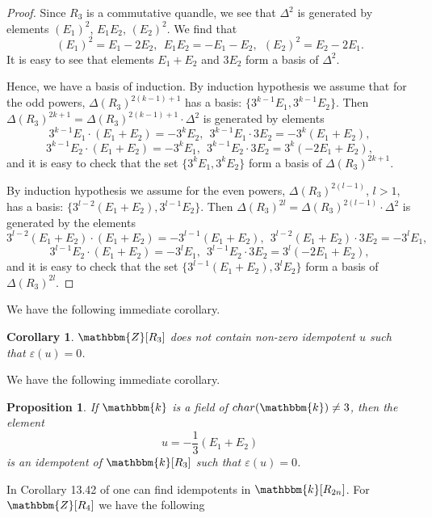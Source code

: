 \documentclass[12pt]{amsart}
\newtheorem{pro}[thm]{Proposition}
\newtheorem{cor}[thm]{Corollary}
\theoremstyle{definition}
\theoremstyle{remark}
\begin{document}
\begin{proof}

Since $R_3$ is a commutative quandle, we see that $\Delta^2$ is generated by elements $(E_1)^2$, $E_1 E_2$, $(E_2)^2$. We find that
$$
(E_1)^2 = E_1 - 2 E_2,~~E_1 E_2 = - E_1 -  E_2,~~(E_2)^2 = E_2 - 2 E_1.
$$
It is easy to see that elements $E_1 + E_2$ and $3 E_2$ form a basis of $\Delta^2$.

Hence, we have a basis of induction.  By induction hypothesis we assume that for the odd powers,   $\Delta(R_3)^{2(k-1) + 1}$  has a basis: $\{ 3^{k-1} E_1, 3^{k-1} E_2 \}$. Then $\Delta(R_3)^{2k + 1} = \Delta(R_3)^{2(k-1) + 1} \cdot \Delta^2$ is generated by elements
$$
3^{k-1} E_1 \cdot (E_1 + E_2) = - 3^{k} E_2,~~3^{k-1} E_1 \cdot 3 E_2 = - 3^{k} (E_1 + E_2),
$$
$$
3^{k-1} E_2 \cdot (E_1 + E_2) =  - 3^k E_1,~~
3^{k-1} E_2 \cdot 3 E_2 =  3^k (-2 E_1 + E_2),
$$
and it is easy to check that the set  $\{ 3^{k} E_1, 3^{k} E_2 \}$ form a basis of  $\Delta(R_3)^{2k + 1}$.

 By  induction hypothesis we assume for the even powers,   $\Delta(R_3)^{2(l-1)}$, $l > 1$,  has a basis: $\{ 3^{l-2} (E_1 + E_2), 3^{l-1} E_2 \}$. Then $\Delta(R_3)^{2l} = \Delta(R_3)^{2(l-1)}\cdot \Delta^2$ is generated by the elements
$$
3^{l-2} (E_1 + E_2) \cdot (E_1 + E_2) = - 3^{l-1} (E_1 + E_2),~~3^{l-2} (E_1 + E_2) \cdot 3 E_2 = - 3^{l} E_1,
$$
$$
3^{l-1} E_2  \cdot (E_1 + E_2) =  - 3^l E_1,~~3^{l-1} E_2  \cdot 3 E_2 =  3^l (-2 E_1 + E_2),
$$
and it is easy to check that the set  $\{ 3^{l-1}(E_1 + E_2), 3^{l} E_2 \}$ form a basis of  $\Delta(R_3)^{2l}$.

\end{proof}

We have the following immediate corollary.

\begin{cor}
$\mathbbm {Z}[R_3]$ does not contain non-zero idempotent $u$ such that  $\varepsilon(u) = 0$.
\end{cor}

We have the following immediate corollary.

\begin{pro}\label{pro4.9}
If $\mathbbm {k}$ is a field of $char(\mathbbm {k}) \not=3$,  then the element
$$
u = - \frac{1}{3} \left( E_1 + E_2\right)
$$
is an idempotent of $\mathbbm {k}[R_3]$ such that  $\varepsilon(u) = 0$.
\end{pro}


 In Corollary 13.42 of \cite{BES} one can find idempotents in $\mathbbm {k}[R_{2n}]$.
For $\mathbbm {Z} [R_4]$ we have the following
\end{document}
